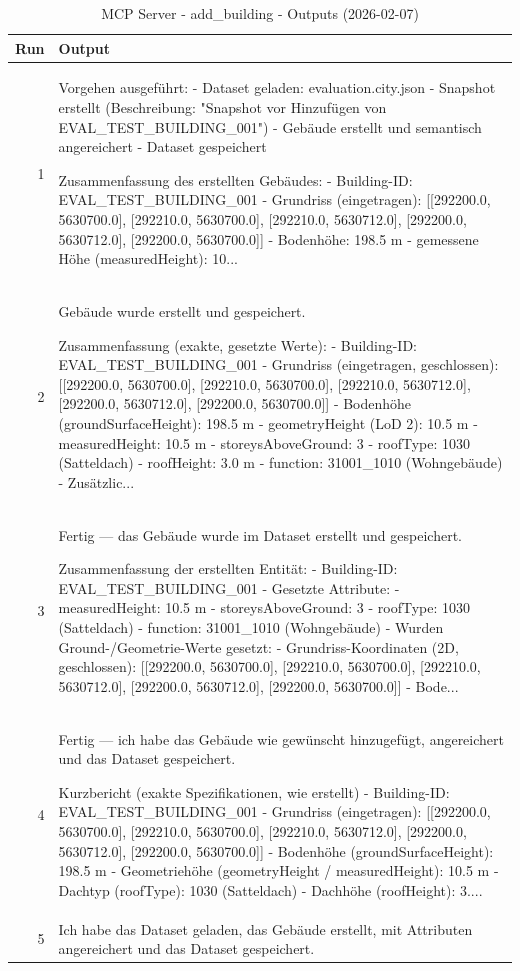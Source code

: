 \documentclass[a4paper,11pt]{article}
\begin{document}
\begin{table}[ht]
\centering
\scriptsize
\caption{MCP Server - add\_building - Outputs (2026-02-07)}
\label{tab:mcp\_add\_building\_outputs\_2026-02-07}
\begin{tabular}{r p{12cm}}
\hline
Run & Output \\
\hline
1 & Vorgehen ausgeführt:
- Dataset geladen: evaluation.city.json
- Snapshot erstellt (Beschreibung: "Snapshot vor Hinzufügen von EVAL\_TEST\_BUILDING\_001")
- Gebäude erstellt und semantisch angereichert
- Dataset gespeichert

Zusammenfassung des erstellten Gebäudes:
- Building-ID: EVAL\_TEST\_BUILDING\_001
- Grundriss (eingetragen): [[292200.0, 5630700.0], [292210.0, 5630700.0], [292210.0, 5630712.0], [292200.0, 5630712.0], [292200.0, 5630700.0]]
- Bodenhöhe: 198.5 m
- gemessene Höhe (measuredHeight): 10... \\
2 & Gebäude wurde erstellt und gespeichert.

Zusammenfassung (exakte, gesetzte Werte):
- Building-ID: EVAL\_TEST\_BUILDING\_001
- Grundriss (eingetragen, geschlossen): [[292200.0, 5630700.0], [292210.0, 5630700.0], [292210.0, 5630712.0], [292200.0, 5630712.0], [292200.0, 5630700.0]]
- Bodenhöhe (groundSurfaceHeight): 198.5 m
- geometryHeight (LoD 2): 10.5 m
- measuredHeight: 10.5 m
- storeysAboveGround: 3
- roofType: 1030 (Satteldach)
- roofHeight: 3.0 m
- function: 31001\_1010 (Wohngebäude)
- Zusätzlic... \\
3 & Fertig — das Gebäude wurde im Dataset erstellt und gespeichert.

Zusammenfassung der erstellten Entität:
- Building-ID: EVAL\_TEST\_BUILDING\_001
- Gesetzte Attribute:
  - measuredHeight: 10.5 m
  - storeysAboveGround: 3
  - roofType: 1030 (Satteldach)
  - function: 31001\_1010 (Wohngebäude)
- Wurden Ground-/Geometrie-Werte gesetzt:
  - Grundriss-Koordinaten (2D, geschlossen): [[292200.0, 5630700.0], [292210.0, 5630700.0], [292210.0, 5630712.0], [292200.0, 5630712.0], [292200.0, 5630700.0]]
  - Bode... \\
4 & Fertig — ich habe das Gebäude wie gewünscht hinzugefügt, angereichert und das Dataset gespeichert.

Kurzbericht (exakte Spezifikationen, wie erstellt)
- Building-ID: EVAL\_TEST\_BUILDING\_001
- Grundriss (eingetragen): [[292200.0, 5630700.0], [292210.0, 5630700.0], [292210.0, 5630712.0], [292200.0, 5630712.0], [292200.0, 5630700.0]]
- Bodenhöhe (groundSurfaceHeight): 198.5 m
- Geometriehöhe (geometryHeight / measuredHeight): 10.5 m
- Dachtyp (roofType): 1030 (Satteldach)
- Dachhöhe (roofHeight): 3.... \\
5 & Ich habe das Dataset geladen, das Gebäude erstellt, mit Attributen angereichert und das Dataset gespeichert.


\end{tabular}
\end{table}
\end{document}
